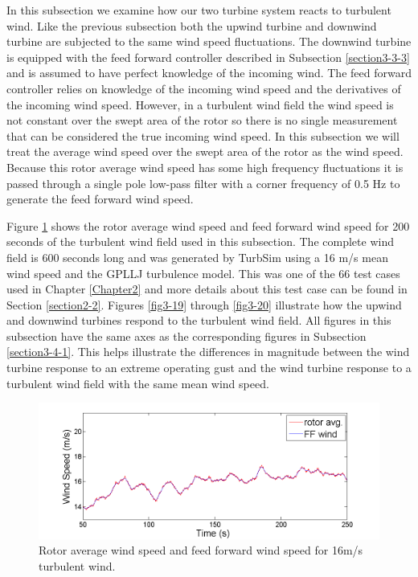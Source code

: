 In this subsection we examine how our two turbine system reacts to turbulent wind. Like the previous subsection both the upwind turbine and downwind turbine are subjected to the same wind speed fluctuations. The downwind turbine is equipped with the feed forward controller described in Subsection \ref{section3-3-3} and is assumed to have perfect knowledge of the incoming wind. The feed forward controller relies on knowledge of the incoming wind speed and the derivatives of the incoming wind speed. However, in a turbulent wind field the wind speed is not constant over the swept area of the rotor so there is no single measurement that can be considered the true incoming wind speed. In this subsection we will treat the average wind speed over the swept area of the rotor as the wind speed. Because this rotor average wind speed has some high frequency fluctuations it is passed through a single pole low-pass filter with a corner frequency of 0.5 Hz to generate the feed forward wind speed.

Figure \ref{fig3-18} shows the rotor average wind speed and feed forward wind speed for 200 seconds of the turbulent wind field used in this subsection. The complete wind field is 600 seconds long and was generated by TurbSim using a 16 m/s mean wind speed and the GPLLJ turbulence model. This was one of the 66 test cases used in Chapter \ref{Chapter2} and more details about this test case can be found in Section \ref{section2-2}. Figures \ref{fig3-19} through \ref{fig3-20} illustrate how the upwind and downwind turbines respond to the turbulent wind field. All figures in this subsection have the same axes as the corresponding figures in Subsection \ref{section3-4-1}. This helps illustrate the differences in magnitude between the wind turbine response to an extreme operating gust and the wind turbine response to a turbulent wind field with the same mean wind speed.

\begin{figure}[htbp]
	\centering
		\includegraphics[trim = {1cm 0 2cm 0}, clip, width = \linewidth]{Figures/ch3Figures/fig3-18.png}
		
	\caption{Rotor average wind speed and feed forward wind speed for 16m/s turbulent wind.}
	\label{fig3-18}
\end{figure}

